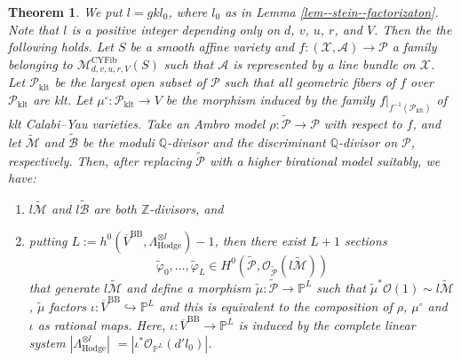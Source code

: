\documentclass[12pt,twoside]{amsart}
\newtheorem{thm}{Theorem}[section]
\theoremstyle{definition}
\begin{document}
\begin{thm}\label{thm--Fujino's--period--mapping--theory}
    We put $l=gkl_0$, where $l_0$ as in Lemma \ref{lem--stein--factorizaton}. 
    Note that $l$ is a positive integer depending only on $d$, $v$, $u$, $r$, and $V$. 
    Then the the following holds.
    Let $S$ be a smooth affine variety and $f\colon (\mathcal{X},\mathcal{A})\to\mathcal{P}$ a family belonging to $\mathcal{M}_{d,v,u,r,V}^{\mathrm{CYFib}}(S)$ such that $\mathcal{A}$ is represented by a line bundle on $\mathcal{X}$.
    Let $\mathcal{P}_{\mathrm{klt}}$ be the largest open subset of $\mathcal{P}$ such that all geometric fibers of $f$ over $\mathcal{P}_{\mathrm{klt}}$ are klt. 
    Let $\mu^\circ\colon \mathcal{P}_{\mathrm{klt}}\to V$ be the morphism induced by the family $f|_{f^{-1}(\mathcal{P}_{\mathrm{klt}})}$ of klt Calabi--Yau varieties. 
    Take an Ambro model $\rho\colon\widetilde{\mathcal{P}}\to \mathcal{P}$ with respect to $f$, and let $\widetilde{\mathcal{M}}$ and $\widetilde{\mathcal{B}}$ be the moduli $\mathbb{Q}$-divisor and the discriminant $\mathbb{Q}$-divisor on $\mathcal{P}$, respectively.
    Then, after replacing $\widetilde{\mathcal{P}}$ with a higher birational model suitably, we have:
    \begin{enumerate}
       \item \label{thm--Fujino's--period--mapping--theory-(1)} $l\widetilde{\mathcal{M}}$ and $l\widetilde{\mathcal{B}}$ are both $\mathbb{Z}$-divisors, and
        \item \label{thm--Fujino's--period--mapping--theory-(2)} putting $L:=h^0(\overline{V}^{\mathrm{BB}},\Lambda^{\otimes l}_{\mathrm{Hodge}})-1$, then there exist $L+1$ sections $$\widetilde{\varphi}_0,\ldots,\widetilde{\varphi}_L\in H^0(\widetilde{\mathcal{P}},\mathcal{O}_{\widetilde{\mathcal{P}}}(l\widetilde{\mathcal{M}}))$$ that generate $l\widetilde{\mathcal{M}}$ and define a morphism $\widetilde{\mu}\colon\widetilde{\mathcal{P}}\to \mathbb{P}^L$ such that $\widetilde{\mu}^*\mathcal{O}(1)\sim l\widetilde{\mathcal{M}}$, $\widetilde{\mu}$ factors $\iota\colon \overline{V}^{\mathrm{BB}}\hookrightarrow \mathbb{P}^L$ and this is equivalent to the composition of  $\rho$, $\mu^\circ$ and $\iota$ as rational maps.  
        Here, $\iota\colon \overline{V}^{\mathrm{BB}}\to \mathbb{P}^L$ is induced by the complete linear system $|\Lambda^{\otimes l}_{\mathrm{Hodge}}|$ $=|\iota^*\mathcal{O}_{\mathbb{P}^L}(d'l_{0})|$. 
    \end{enumerate}
\end{thm}
\end{document}
